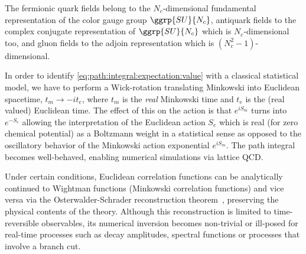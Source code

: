 The fermionic quark fields belong to the $N_c$-dimensional fundamental representation of the color gauge group $\ggrp{SU}{N_c}$, antiquark fields to the complex conjugate representation of $\ggrp{SU}{N_c}$ which is $N_c$-dimensional too, and gluon fields to the adjoin representation which is $(N_c^{2}-1)$-dimensional.

In order to identify \cref{eq:path:integral:expectation:value} with a classical statistical model, we have to perform a Wick-rotation translating Minkowski into Euclidean spacetime, $t_m \to -i t_e$, where $t_m$ is the \emph{real} Minkowski time and $t_e$ is the (real valued) Euclidean time.
The effect of this on the action is that $e^{i S_m}$ turns into $e^{- S_e}$ allowing the interpretation of the Euclidean action $S_e$ which is real (for zero chemical potential) as a Boltzmann weight in a statistical sense as opposed to the oscillatory behavior of the Minkowski action exponential $e^{i S_m}$.
The path integral becomes well-behaved, enabling numerical simulations via lattice QCD.




Under certain conditions, Euclidean correlation functions can be analytically continued to Wightman functions (Minkowski correlation functions) and vice versa via the Osterwalder-Schrader reconstruction theorem~\cite{Osterwalder:1973dx,Osterwalder:1974tc}, preserving the physical contents of the theory.
Although this reconstruction is limited to time-reversible observables, its numerical inversion becomes non-trivial or ill-posed for real-time processes such as decay amplitudes, spectral functions or processes that involve a branch cut. 

